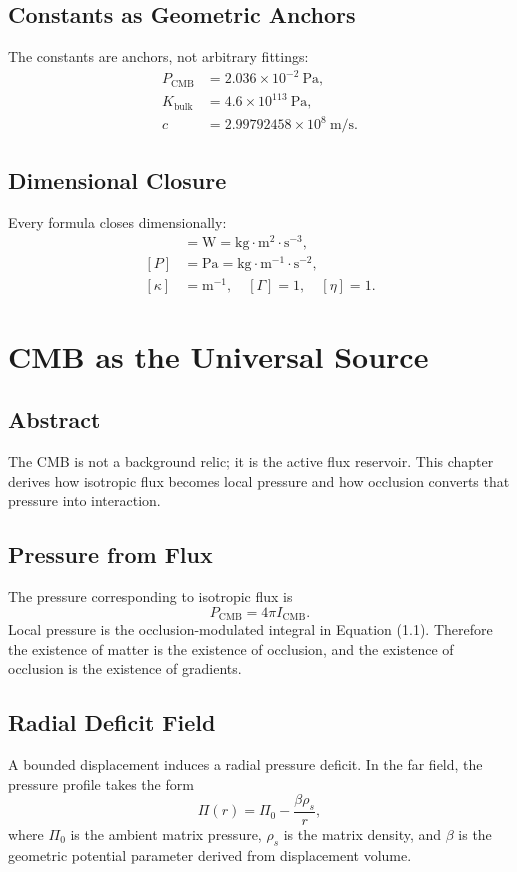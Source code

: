 \documentclass[12pt]{book}
\begin{document}
\section{Constants as Geometric Anchors}
The constants are anchors, not arbitrary fittings:
\begin{align}
P_{\text{CMB}} &= 2.036 \times 10^{-2}\ \text{Pa},\\
K_{\text{bulk}} &= 4.6 \times 10^{113}\ \text{Pa},\\
c &= 2.99792458 \times 10^8\ \text{m/s}.
\end{align}

\section{Dimensional Closure}
Every formula closes dimensionally:
\begin{align}
[\dot{E}] &= \text{W} = \text{kg}\cdot \text{m}^2\cdot \text{s}^{-3},\\
[P] &= \text{Pa} = \text{kg}\cdot \text{m}^{-1}\cdot \text{s}^{-2},\\
[\kappa] &= \text{m}^{-1},\quad [\Gamma]=1,\quad [\eta]=1.
\end{align}

\chapter{CMB as the Universal Source}

\section*{Abstract}
The CMB is not a background relic; it is the active flux reservoir. This chapter derives how isotropic
flux becomes local pressure and how occlusion converts that pressure into interaction.

\section{Pressure from Flux}
The pressure corresponding to isotropic flux is
\begin{equation}
P_{\text{CMB}} = 4\pi I_{\text{CMB}}.
\end{equation}
Local pressure is the occlusion-modulated integral in Equation (1.1). Therefore the existence of matter
is the existence of occlusion, and the existence of occlusion is the existence of gradients.

\section{Radial Deficit Field}
A bounded displacement induces a radial pressure deficit. In the far field, the pressure profile takes
the form
\begin{equation}
\Pi(r) = \Pi_0 - \frac{\beta \rho_s}{r},
\end{equation}
where $\Pi_0$ is the ambient matrix pressure, $\rho_s$ is the matrix density, and $\beta$ is the
geometric potential parameter derived from displacement volume.
\end{document}
